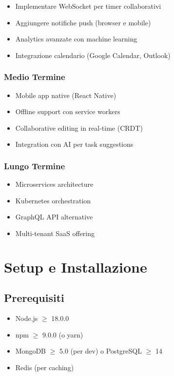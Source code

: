 \documentclass[12pt,a4paper]{report}
\begin{document}
\begin{itemize}
    \item Implementare WebSocket per timer collaborativi
    \item Aggiungere notifiche push (browser e mobile)
    \item Analytics avanzate con machine learning
    \item Integrazione calendario (Google Calendar, Outlook)
\end{itemize}

\subsection{Medio Termine}

\begin{itemize}
    \item Mobile app native (React Native)
    \item Offline support con service workers
    \item Collaborative editing in real-time (CRDT)
    \item Integration con AI per task suggestions
\end{itemize}

\subsection{Lungo Termine}

\begin{itemize}
    \item Microservices architecture
    \item Kubernetes orchestration
    \item GraphQL API alternative
    \item Multi-tenant SaaS offering
\end{itemize}

\newpage

\appendix

\chapter{Setup e Installazione}

\section{Prerequisiti}

\begin{itemize}
    \item Node.js $\geq$ 18.0.0
    \item npm $\geq$ 9.0.0 (o yarn)
    \item MongoDB $\geq$ 5.0 (per dev) o PostgreSQL $\geq$ 14
    \item Redis (per caching)
\end{itemize}
\end{document}
